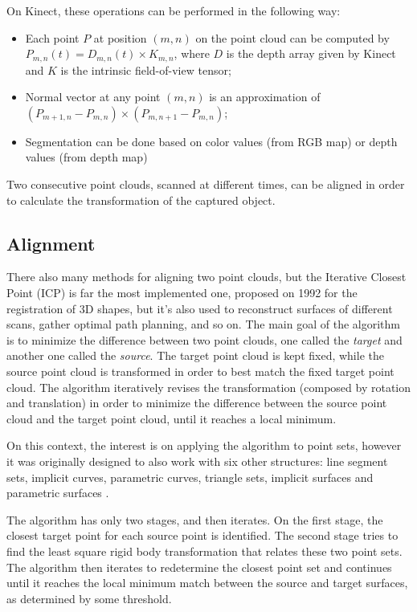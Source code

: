 \documentclass[msc, a4paper, classic, en]{ufbathesis}
\begin{document}
On Kinect, these operations can be performed in the following way:

\begin{itemize}
  \item Each point $P$ at position $(m, n)$ on the point cloud can be computed by $P_{m, n}(t) = D_{m, n}(t) \times K_{m, n}$, where $D$ is the depth array given by Kinect and $K$ is the intrinsic field-of-view tensor;
  \item Normal vector at any point $(m, n)$ is an approximation of $(P_{m+1, n} - P_{m,n}) \times (P_{m, n+1} - P_{m,n})$;
  \item Segmentation can be done based on color values (from RGB map) or depth values (from depth map)
\end{itemize}

Two consecutive point clouds, scanned at different times, can be aligned in order to calculate the transformation of the captured object.

\subsection{Alignment}
\label{sec:icp}

There also many methods for aligning two point clouds, but the Iterative Closest Point (ICP) \cite{icp} is far the most implemented one, proposed on 1992 for the registration of 3D shapes, but it's also used to reconstruct surfaces of different scans, gather optimal path planning, and so on. The main goal of the algorithm is to minimize the difference between two point clouds, one called the \textit{target} and another one called the \textit{source}. The target point cloud is kept fixed, while the source point cloud is transformed in order to best match the fixed target point cloud. The algorithm iteratively revises the transformation (composed by rotation and translation) in order to minimize the difference between the source point cloud and the target point cloud, until it reaches a local minimum.

On this context, the interest is on applying the algorithm to point sets, however it was originally designed to also work with six other structures: line segment sets, implicit curves, parametric curves, triangle sets, implicit surfaces and parametric surfaces \cite{hajnal2014medical}.

The algorithm has only two stages, and then iterates. On the first stage, the closest target point for each source point is identified. The second stage tries to find the least square rigid body transformation that relates these two point sets. The algorithm then iterates to redetermine the closest point set and continues until it reaches the local minimum match between the source and target surfaces, as determined by some threshold.
\end{document}
